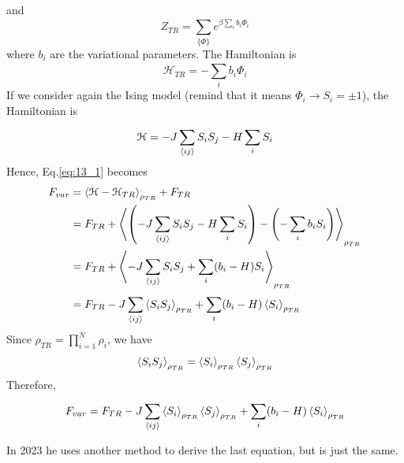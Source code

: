 \documentclass[../../Main/Main.tex]{subfiles}
\begin{document}
and
\begin{equation}
  Z_{TR} = \sum_{\{ \Phi  \}  }^{}  e^{\beta \sum_{i}^{} b_i \Phi _i  }
\end{equation}
where \( b_i \) are the variational parameters. The Hamiltonian is 
\begin{equation}
  \mathcal{H}_{TR} = - \sum_{i}^{} b_i \Phi _i
\end{equation}
If we consider again the Ising model (remind that it means \(\Phi_i \rightarrow S_i = \pm 1\)), the Hamiltonian is
\begin{equation*}
  \mathcal{H} = - J \sum_{\expval{ij} }^{} S_i S_j - H \sum_{i}^{} S_i
\end{equation*}
Hence, Eq.\eqref{eq:13_1} becomes
\begin{equation*}
\begin{split}
F_{var}  &= \expval{\mathcal{H} - \mathcal{H}_{TR}}_{\rho _{TR}} + F_{TR}   \\
& = F_{TR} + \expval{\qty(- J \sum_{\expval{ij} }^{} S_i S_j - H \sum_{i}^{} S_i    ) - \qty(- \sum_{i}^{} b_i S_i )  }_{\rho _{TR}} \\
& = F_{TR} + \expval{-J \sum_{\expval{ij} }^{} S_i S_j + \sum_{i}^{} (b_i-H) S_i   }_{\rho _{TR}} \\
& = F_{TR} - J \sum_{\expval{ij} }^{} \expval{S_i S_j}_{\rho _{TR}} + \sum_{i}^{} (b_i - H) \expval{S_i}_{\rho _{TR}}
\end{split}
\end{equation*}
Since \( \rho _{TR} = \prod_{i=1}^{N} \rho _i  \), we have 
\begin{equation*}
  \expval{S_i S_j}_{\rho _{TR}}  = \expval{S_i}_{\rho _{TR}}  \expval{S_j}_{\rho _{TR}}
\end{equation*}
Therefore,
\begin{equation*}
  F_{var} = F_{TR} - J \sum_{\expval{ij} }^{} \expval{S_i}_{\rho _{TR}}  \expval{S_j}_{\rho _{TR}}  + \sum_{i}^{} (b_i - H) \expval{S_i}_{\rho _{TR}}
\end{equation*}

\begin{remark}
In 2023 he uses another method to derive the last equation, but is just the same.
\end{remark}
\end{document}
